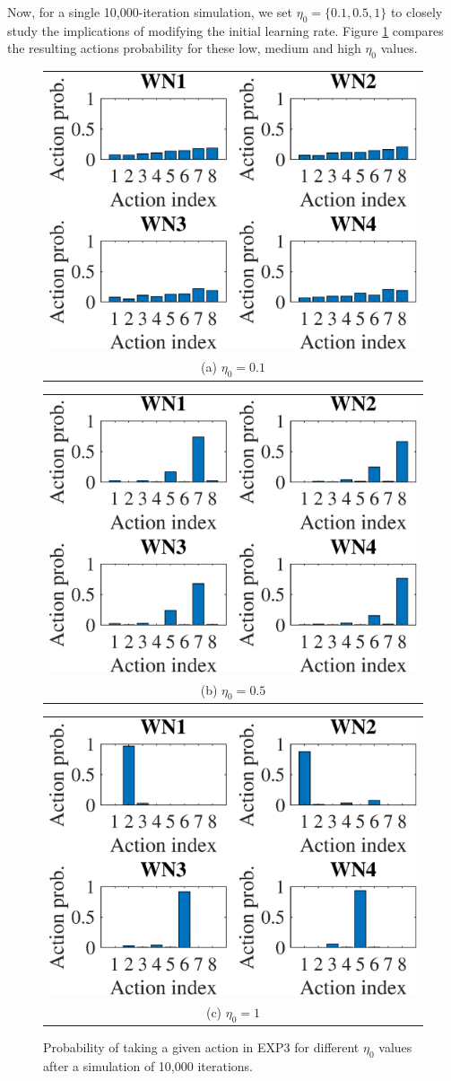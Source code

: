 \documentclass[preprint,12pt]{elsarticle}
\begin{document}
Now, for a single 10,000-iteration simulation, we set $\eta_0 = \{0.1, 0.5, 1\}$ to closely study the implications of modifying the initial learning rate. Figure \ref{fig:exp3_actions_distr} compares the resulting actions probability for these low, medium and high $\eta_0$ values.
\begin{figure}
	\centering
	\begin{tabular}{@{}c@{}}
		\includegraphics[width=.3\textwidth]{images/NEW_actions_probability_EXP3_eta01} \\[\abovecaptionskip]
		\small (a) $\eta_0 = 0.1$
		\label{fig:exp3_eta01_actions_distr}
	\end{tabular}	
	\hspace{\floatsep}	
	\begin{tabular}{@{}c@{}}
		\includegraphics[width=.3\textwidth]{images/NEW_actions_probability_EXP3_eta05} \\[\abovecaptionskip]
		\small (b) $\eta_0 = 0.5$
		\label{fig:exp3_eta05_actions_distr}
	\end{tabular}
	\hspace{\floatsep}
	\begin{tabular}{@{}c@{}}
		\includegraphics[width=.3\textwidth]{images/NEW_actions_probability_EXP3_eta1} \\[\abovecaptionskip]
		\small (c) $\eta_0 = 1$
		\label{fig:exp3_eta1_actions_distr}
	\end{tabular}
	\caption{Probability of taking a given action in EXP3 for different $\eta_0$ values after a simulation of 10,000 iterations.}
	\label{fig:exp3_actions_distr}
\end{figure}
\end{document}
